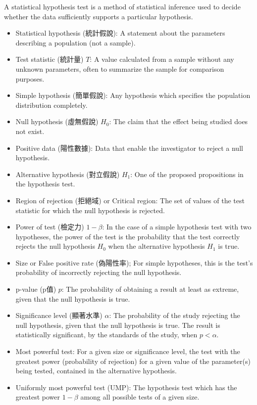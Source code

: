 \documentclass[a4paper,12pt]{report}
\begin{document}
A statistical hypothesis test is a method of statistical inference used to decide whether the data sufficiently supports a particular hypothesis.
\begin{itemize}
\item Statistical hypothesis (統計假說): A statement about the parameters describing a population (not a sample).
\item Test statistic (統計量) $T$: A value calculated from a sample without any unknown parameters, often to summarize the sample for comparison purposes.
\item Simple hypothesis (簡單假說): Any hypothesis which specifies the population distribution completely.
\item Null hypothesis (虛無假說) $H_0$: The claim that the effect being studied does not exist.
\item Positive data (陽性數據): Data that enable the investigator to reject a null hypothesis.
\item Alternative hypothesis (對立假說) $H_1$: One of the proposed propositions in the hypothesis test.
\item Region of rejection (拒絕域) or Critical region: The set of values of the test statistic for which the null hypothesis is rejected.
\item Power of test (檢定力) $1-\beta$: In the case of a simple hypothesis test with two hypotheses, the power of the test is the probability that the test correctly rejects the null hypothesis $H_0$ when the alternative hypothesis $H_1$ is true.
\item Size or False positive rate (偽陽性率); For simple hypotheses, this is the test's probability of incorrectly rejecting the null hypothesis.
\item p-value (p值) $p$: The probability of obtaining a result at least as extreme, given that the null hypothesis is true.
\item Significance level (顯著水準) $\alpha$: The probability of the study rejecting the null hypothesis, given that the null hypothesis is true. The result is statistically significant, by the standards of the study, when $p<\alpha$.
\item Most powerful test: For a given size or significance level, the test with the greatest power (probability of rejection) for a given value of the parameter(s) being tested, contained in the alternative hypothesis.
\item Uniformly most powerful test (UMP): The hypothesis test which has the greatest power $1-\beta$ among all possible tests of a given size. 
\end{itemize}
\end{document}
